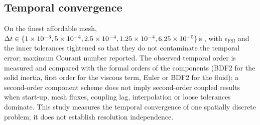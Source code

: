 \subsection{Temporal convergence}\label{sec:ver:time}
On the finest affordable mesh,
$\Delta t \in \{\num{1e-3},\num{5e-4},\num{2.5e-4},\num{1.25e-4},\num{6.25e-5}\}$\,s
, with $\epsilon_{\mathrm{FSI}}$ and the inner
tolerances tightened so that they do not contaminate the temporal error;
maximum Courant number reported. The observed temporal order is measured
and compared with the formal orders of the components (BDF2 for the solid
inertia, first order for the viscous term, Euler or BDF2 for the fluid);
a second-order component scheme does not imply second-order coupled
results when start-up, mesh fluxes, coupling lag, interpolation or loose
tolerances dominate. This study measures the temporal convergence of one
spatially discrete problem; it does not establish resolution independence.

